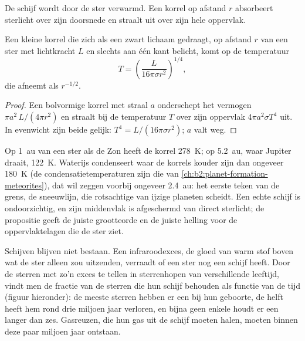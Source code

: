 De schijf wordt door de ster verwarmd. Een korrel op afstand $r$ absorbeert sterlicht
over zijn doorsnede en straalt uit over zijn hele oppervlak.

\begin{proposition}
\label{prop:b2:ism-star-formation:grain}
Een kleine korrel die zich als een zwart lichaam gedraagt, op afstand $r$ van een ster met
lichtkracht $L$ en slechts aan één kant belicht, komt op de temperatuur
\[
  T = \left(\frac{L}{16\pi\sigma r^2}\right)^{1/4},
\]
die afneemt als $r^{-1/2}$.
\end{proposition}

\begin{proof}
Een bolvormige korrel met straal $a$ onderschept het vermogen $\pi a^2\,L/(4\pi r^2)$
en straalt bij de temperatuur $T$ over zijn oppervlak $4\pi a^2\sigma T^4$ uit.
In evenwicht zijn beide gelijk: $T^4 = L/(16\pi\sigma r^2)$; $a$ valt weg.
\end{proof}

Op \qty{1}{au} van een ster als de Zon heeft de korrel \qty{278}{K}; op
\qty{5.2}{au}, waar Jupiter draait, \qty{122}{K}. Waterijs condenseert waar
de korrels kouder zijn dan ongeveer \qty{180}{K} (de condensatietemperaturen zijn
die van \cref{ch:b2:planet-formation-meteorites}), dat wil zeggen voorbij ongeveer
\qty{2.4}{au}: het eerste teken van de grens, de sneeuwlijn, die
rotsachtige van ijzige planeten scheidt. Een echte schijf is ondoorzichtig, en zijn middenvlak is afgeschermd van direct sterlicht; de
propositie geeft de juiste grootteorde en de juiste helling voor de
oppervlaktelagen die de ster ziet.

Schijven blijven niet bestaan. Een infraroodexces, de gloed van warm stof boven wat de ster
alleen zou uitzenden, verraadt of een ster nog een schijf heeft. Door de sterren
met zo'n exces te tellen in sterrenhopen van verschillende leeftijd, vindt men de fractie van de sterren
die hun schijf behouden als functie van de tijd (figuur hieronder): de meeste sterren hebben er een
bij hun geboorte, de helft heeft hem rond drie miljoen jaar verloren, en bijna geen enkele
houdt er een langer dan zes. Gasreuzen, die hun gas uit de schijf moeten halen,
moeten binnen deze paar miljoen jaar ontstaan.

